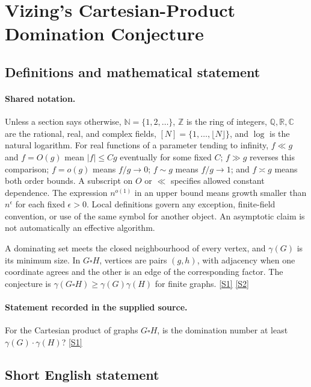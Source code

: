 \documentclass[11pt,a4paper]{article}
\newcommand{\N}{\mathbb{N}}
\newcommand{\Z}{\mathbb{Z}}
\newcommand{\Q}{\mathbb{Q}}
\newcommand{\R}{\mathbb{R}}
\newcommand{\C}{\mathbb{C}}
\newcommand{\sref}[2]{\hyperlink{source:#1:#2}{[S#2]}}
\begin{document}
\section{Vizing’s Cartesian-Product Domination Conjecture}\label{statement}


\subsection{Definitions and mathematical statement}

\paragraph{Shared notation.}Unless a section says otherwise, $\N=\{1,2,\ldots\}$,
$\Z$ is the ring of integers, $\Q,\R,\C$ are the rational, real, and complex
fields, $[N]=\{1,\ldots,\lfloor N\rfloor\}$, and $\log$ is the natural
logarithm. For real functions of a parameter tending to infinity,
$f\ll g$ and $f=O(g)$ mean $|f|\leq Cg$ eventually for some fixed $C$;
$f\gg g$ reverses this comparison; $f=o(g)$ means $f/g\to0$;
$f\sim g$ means $f/g\to1$; and $f\asymp g$ means both order bounds.
A subscript on $O$ or $\ll$ specifies allowed constant dependence.
The expression $n^{o(1)}$ in an upper bound means growth smaller than
$n^\epsilon$ for each fixed $\epsilon>0$. Local definitions govern any
exception, finite-field convention, or use of the same symbol for another
object. An asymptotic claim is not automatically an effective algorithm.



A dominating set meets the closed neighbourhood of every vertex, and $\gamma(G)$ is its minimum size. In $G\square H$, vertices are pairs $(g,h)$, with adjacency when one coordinate agrees and the other is an edge of the corresponding factor. The conjecture is $\gamma(G\square H)\geq\gamma(G)\gamma(H)$ for finite graphs. \sref{statement}{1} \sref{statement}{2}

\paragraph{Statement recorded in the supplied source.}
For the Cartesian product of graphs $G \square H$, is the domination number at least $\gamma(G) \cdot \gamma(H)$? \sref{statement}{1}

\subsection{Short English statement}
\end{document}
